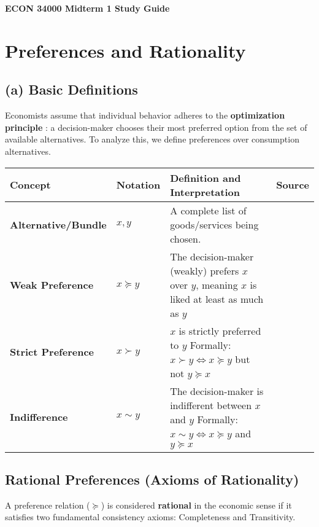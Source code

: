 \documentclass{article}
\begin{document}
\begin{center}
    {\Huge \textbf{ECON 34000 Midterm 1 Study Guide}}
\end{center}

\tableofcontents

\pagebreak
\section{Preferences and Rationality}

\subsection*{ (a) Basic Definitions}

Economists assume that individual behavior adheres to the \textbf{optimization principle} : a decision-maker chooses their most preferred option from the set of available alternatives. To analyze this, we define preferences over consumption alternatives.

\begin{center}
\begin{tabular}{>{\bfseries}l l p{11cm} l}
\toprule
\textbf{Concept} & \textbf{Notation} & \textbf{Definition and Interpretation} & \textbf{Source} \\
\midrule
Alternative/Bundle & $x, y$ & A complete list of goods/services being chosen. & \\
Weak Preference & $x \succeq y$ & The decision-maker (weakly) prefers $x$ over $y$, meaning $x$ is liked at least as much as $y$ & \\
Strict Preference & $x \succ y$ & $x$ is strictly preferred to $y$ Formally: $x \succ y \iff x \succeq y$ but not $y \succeq x$ & \\
Indifference & $x \sim y$ & The decision-maker is indifferent between $x$ and $y$ Formally: $x \sim y \iff x \succeq y$ and $y \succeq x$ & \\
\bottomrule

\end{tabular}

\end{center}

\subsection{Rational Preferences (Axioms of Rationality)}

A preference relation ($\succeq$) is considered \textbf{rational} in the economic sense if it satisfies two fundamental consistency axioms: Completeness and Transitivity.
\end{document}
